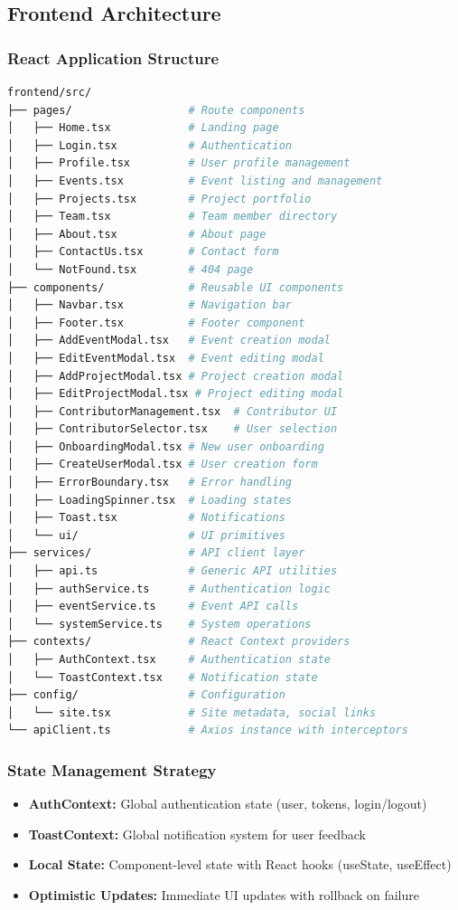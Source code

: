 \documentclass[11pt,a4paper]{article}
\begin{document}
\subsection{Frontend Architecture}

\subsubsection{React Application Structure}
\begin{lstlisting}[language=bash]
frontend/src/
├── pages/                  # Route components
│   ├── Home.tsx            # Landing page
│   ├── Login.tsx           # Authentication
│   ├── Profile.tsx         # User profile management
│   ├── Events.tsx          # Event listing and management
│   ├── Projects.tsx        # Project portfolio
│   ├── Team.tsx            # Team member directory
│   ├── About.tsx           # About page
│   ├── ContactUs.tsx       # Contact form
│   └── NotFound.tsx        # 404 page
├── components/             # Reusable UI components
│   ├── Navbar.tsx          # Navigation bar
│   ├── Footer.tsx          # Footer component
│   ├── AddEventModal.tsx   # Event creation modal
│   ├── EditEventModal.tsx  # Event editing modal
│   ├── AddProjectModal.tsx # Project creation modal
│   ├── EditProjectModal.tsx # Project editing modal
│   ├── ContributorManagement.tsx  # Contributor UI
│   ├── ContributorSelector.tsx    # User selection
│   ├── OnboardingModal.tsx # New user onboarding
│   ├── CreateUserModal.tsx # User creation form
│   ├── ErrorBoundary.tsx   # Error handling
│   ├── LoadingSpinner.tsx  # Loading states
│   ├── Toast.tsx           # Notifications
│   └── ui/                 # UI primitives
├── services/               # API client layer
│   ├── api.ts              # Generic API utilities
│   ├── authService.ts      # Authentication logic
│   ├── eventService.ts     # Event API calls
│   └── systemService.ts    # System operations
├── contexts/               # React Context providers
│   ├── AuthContext.tsx     # Authentication state
│   └── ToastContext.tsx    # Notification state
├── config/                 # Configuration
│   └── site.tsx            # Site metadata, social links
└── apiClient.ts            # Axios instance with interceptors
\end{lstlisting}

\subsubsection{State Management Strategy}
\begin{itemize}[leftmargin=*]
    \item \textbf{AuthContext:} Global authentication state (user, tokens, login/logout)
    \item \textbf{ToastContext:} Global notification system for user feedback
    \item \textbf{Local State:} Component-level state with React hooks (useState, useEffect)
    \item \textbf{Optimistic Updates:} Immediate UI updates with rollback on failure
\end{itemize}
\end{document}
